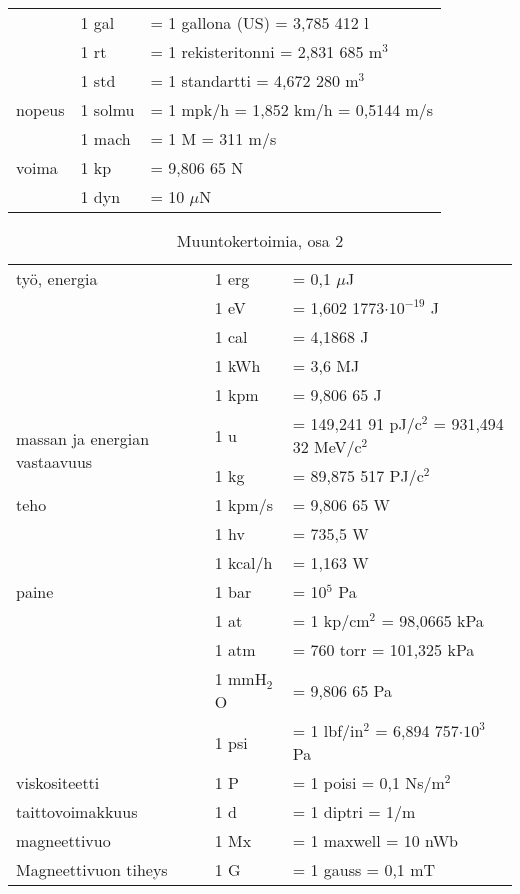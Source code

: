 \begin{table}
\begin{tabular}{l|ll}
			& 1 gal		& = 1 gallona (US) = 3,785 412 l \\
			& 1 rt		& = 1 rekisteritonni = 2,831 685 m$^3$ \\
			& 1 std		& = 1 standartti = 4,672 280 m$^3$ \\
\hline
nopeus		& 1 solmu	& = 1 mpk/h = 1,852 km/h = 0,5144 m/s \\
			& 1 mach	& = 1 M = 311 m/s \\
\hline
voima		& 1 kp		& = 9,806 65 N \\
			& 1 dyn		& = 10 $\mu$N \\
\hline
\end{tabular}
\end{table}


\begin{table}
\centering
\setlength{\extrarowheight}{2pt}
\caption{Muuntokertoimia, osa 2 \cite{MAOL}}
\begin{tabular}{l|ll}
\hline
työ, energia	& 1 erg	& = 0,1 $\mu$J \\
			& 1 eV		& = 1,602 1773$\cdot 10^{-19}$ J \\
			& 1 cal		& = 4,1868 J \\
			& 1 kWh		& = 3,6 MJ \\
			& 1 kpm		& = 9,806 65 J \\
\hline
\multirow{2}{3.2cm}{massan ja energian vastaavuus}
	& 1 u	& = 149,241 91 pJ/c$^2$ = 931,494 32 MeV/c$^2$ \\
	& 1 kg	& = 89,875 517 PJ/c$^2$ \\
\hline
teho	& 1 kpm/s	& = 9,806 65 W \\
		& 1 hv		& = 735,5 W \\
		& 1 kcal/h	& = 1,163 W \\
\hline
paine	& 1 bar		& = 10$^5$ Pa \\
		& 1 at		& = 1 kp/cm$^2$ = 98,0665 kPa \\
		& 1 atm		& = 760 torr = 101,325 kPa \\
		& 1 mmH$_2$O	& = 9,806 65 Pa \\
		& 1 psi		& = 1 lbf/in$^2$ = 6,894 757$\cdot 10^3$ Pa \\
\hline
viskositeetti	& 1 P	& = 1 poisi = 0,1 Ns/m$^2$ \\
\hline
taittovoimakkuus	& 1 d	& = 1 diptri = 1/m \\
\hline
magneettivuo		& 1 Mx	& = 1 maxwell = 10 nWb \\
\hline
\multirow{2}{3cm}{Magneettivuon \newline tiheys}
	& 1 G	& = 1 gauss = 0,1 mT \\

\end{tabular}
\end{table}
